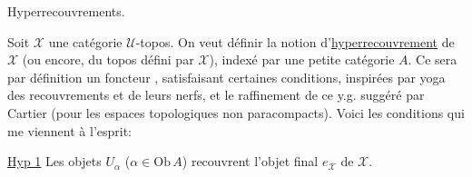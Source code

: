 
Hyperrecouvrements.

Soit $\mathcal X$ une catégorie $\mathcal U$-topos. On veut définir  la notion d'\uline{hyperrecouvrement} de $\mathcal X$ (ou encore, du topos défini par $\mathcal X$), indexé par une petite catégorie $A$.  Ce sera par définition un foncteur
, satisfaisant certaines conditions, inspirées par  yoga  des recouvrements et de leurs nerfs, et le raffinement de ce y.g. suggéré par Cartier (pour les espaces topologiques non paracompacts). Voici les conditions qui me viennent à l'esprit:

\uline{Hyp 1} Les objets $U_\alpha$ ($\alpha\in\mathrm{Ob}\,A$) recouvrent l'objet final $e_{\mathcal X}$ de $\mathcal X$.

